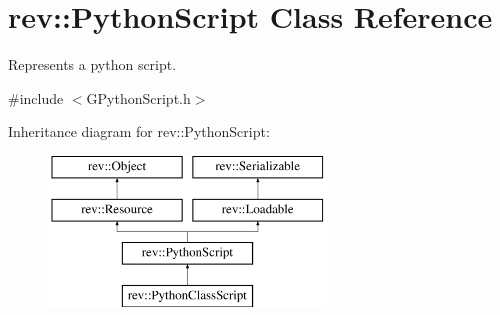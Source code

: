 \hypertarget{classrev_1_1_python_script}{}\section{rev\+::Python\+Script Class Reference}
\label{classrev_1_1_python_script}


Represents a python script.  




{\ttfamily \#include $<$G\+Python\+Script.\+h$>$}

Inheritance diagram for rev\+::Python\+Script\+:\begin{figure}[H]
\begin{center}
\leavevmode
\includegraphics[height=4.000000cm]{classrev_1_1_python_script}
\end{center}
\end{figure}
